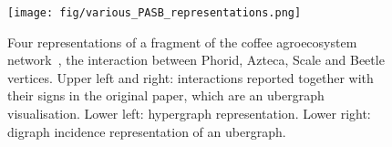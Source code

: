 \documentclass[a4paper,12pt]{article}
\theoremstyle{definition}
\theoremstyle{remark}
\begin{document}

\begin{figure}[h]
    \centering\texttt{[image: fig/various\_PASB\_representations.png]}
    \caption{Four representations of a fragment of the coffee agroecosystem network~\cite{GOLUBSKI2016344}, the interaction between Phorid, Azteca, Scale and Beetle vertices. Upper left and right: interactions reported together with their signs in the original paper, which are an ubergraph visualisation. Lower left: hypergraph representation. Lower right: digraph incidence representation of an ubergraph.}
    \label{rep_of_coffee_comparison}
\end{figure}
\end{document}
